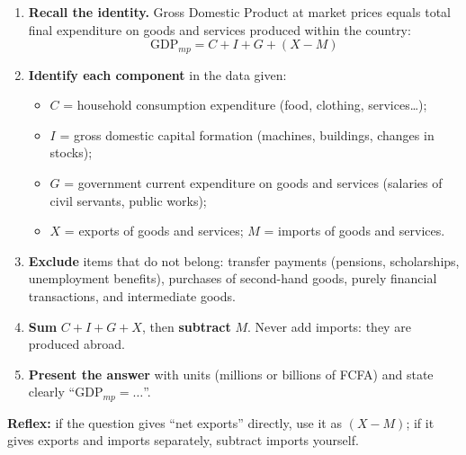 \documentclass[11pt]{article}
\begin{document}
\begin{methode}
\begin{enumerate}
\item \textbf{Recall the identity.} Gross Domestic Product at market prices equals total final expenditure on goods and services produced within the country:
\[ \mathrm{GDP}_{mp} = C + I + G + (X - M) \]
\item \textbf{Identify each component} in the data given:
\begin{itemize}
\item $C$ = household consumption expenditure (food, clothing, services\dots);
\item $I$ = gross domestic capital formation (machines, buildings, changes in stocks);
\item $G$ = government current expenditure on goods and services (salaries of civil servants, public works);
\item $X$ = exports of goods and services; $M$ = imports of goods and services.
\end{itemize}
\item \textbf{Exclude} items that do not belong: transfer payments (pensions, scholarships, unemployment benefits), purchases of second-hand goods, purely financial transactions, and intermediate goods.
\item \textbf{Sum} $C + I + G + X$, then \textbf{subtract} $M$. Never add imports: they are produced abroad.
\item \textbf{Present the answer} with units (millions or billions of FCFA) and state clearly ``$\mathrm{GDP}_{mp} = \dots$''.
\end{enumerate}
\textbf{Reflex:} if the question gives ``net exports'' directly, use it as $(X-M)$; if it gives exports and imports separately, subtract imports yourself.
\end{methode}
\end{document}
